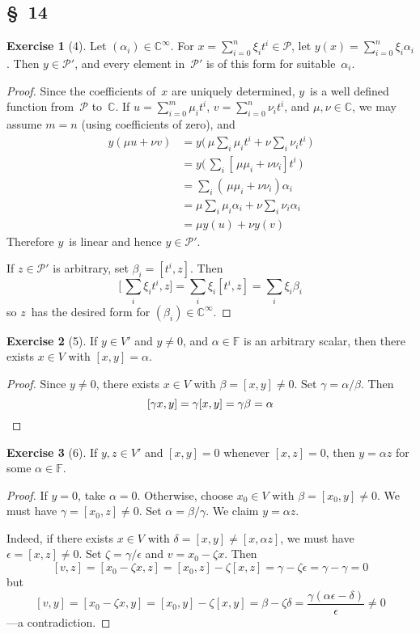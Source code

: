 \documentclass[letterpaper,12pt]{article}
\newcommand{\F}{\mathbb{F}}
\newcommand{\C}{\mathbb{C}}
\renewcommand{\P}{\mathcal{P}}
\theoremstyle{definition}
\newtheorem*{exer}{Exercise}
\theoremstyle{remark}
\theoremstyle{direction}
\begin{document}
\subsection*{\S~14}
\begin{exer}[4]
Let \((\alpha_i)\in\C^{\infty}\). For \(x=\sum_{i=0}^n\xi_i t^i\in\P\), let \(y(x)=\sum_{i=0}^n\xi_i\alpha_i\). Then \(y\in\P'\), and every element in~\(\P'\) is of this form for suitable~\(\alpha_i\).
\end{exer}
\begin{proof}
Since the coefficients of~\(x\) are uniquely determined, \(y\)~is a well defined function from~\(\P\) to~\(\C\). If \(u=\sum_{i=0}^m\mu_i t^i\), \(v=\sum_{i=0}^n\nu_i t^i\), and \(\mu,\nu\in\C\), we may assume \(m=n\) (using coefficients of zero), and
\begin{align*}
y(\mu u+\nu v)&=y\bigl(\,\mu\sum_i\mu_i t^i+\nu\sum_i\nu_i t^i\,\bigr)\\
	&=y\bigl(\,\sum_i[\,\mu\mu_i+\nu\nu_i]t^i\,\bigr)\\
	&=\sum_i(\,\mu\mu_i+\nu\nu_i)\alpha_i\\
	&=\mu\sum_i\mu_i\alpha_i+\nu\sum_i\nu_i\alpha_i\\
	&=\mu y(u)+\nu y(v)
\end{align*}
Therefore \(y\)~is linear and hence \(y\in\P'\).

If \(z\in\P'\) is arbitrary, set \(\beta_i=[t^i,z]\). Then
\[\bigl[\,\sum_i\xi_i t^i,z\bigr]=\sum_i\xi_i[t^i,z]=\sum_i\xi_i\beta_i\]
so \(z\)~has the desired form for \((\beta_i)\in\C^{\infty}\).
\end{proof}

\begin{exer}[5]
If \(y\in V'\) and \(y\ne0\), and \(\alpha\in\F\) is an arbitrary scalar, then there exists \(x\in V\) with \([x,y]=\alpha\).
\end{exer}
\begin{proof}
Since \(y\ne0\), there exists \(x\in V\) with \(\beta=[x,y]\ne0\). Set \(\gamma=\alpha/\beta\). Then
\[[\gamma x,y]=\gamma[x,y]=\gamma\beta=\alpha\qedhere\]
\end{proof}

\begin{exer}[6]
If \(y,z\in V'\) and \([x,y]=0\) whenever \([x,z]=0\), then \(y=\alpha z\) for some \(\alpha\in\F\).
\end{exer}
\begin{proof}
If \(y=0\), take \(\alpha=0\). Otherwise, choose \(x_0\in V\) with \(\beta=[x_0,y]\ne0\). We must have \(\gamma=[x_0,z]\ne0\). Set \(\alpha=\beta/\gamma\). We claim \(y=\alpha z\).

Indeed, if there exists \(x\in V\) with \(\delta=[x,y]\ne[x,\alpha z]\), we must have \(\epsilon=[x,z]\ne0\). Set \(\zeta=\gamma/\epsilon\) and \(v=x_0-\zeta x\). Then
\[[v,z]=[x_0-\zeta x,z]=[x_0,z]-\zeta[x,z]=\gamma-\zeta\epsilon=\gamma-\gamma=0\]
but
\[[v,y]=[x_0-\zeta x,y]=[x_0,y]-\zeta[x,y]=\beta-\zeta\delta=\frac{\gamma(\alpha\epsilon-\delta)}{\epsilon}\ne0\]
---a contradiction.
\end{proof}
\end{document}
